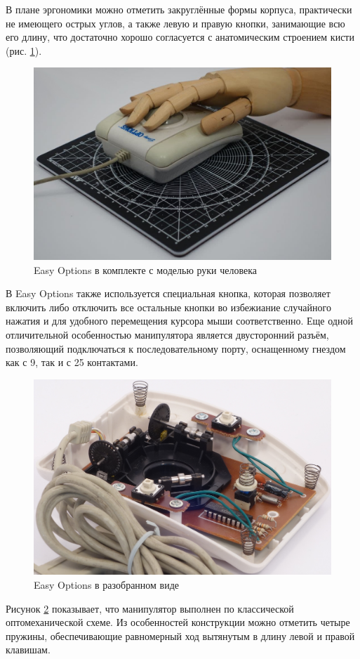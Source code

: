 \documentclass[11pt, a4paper]{article}
\begin{document}
В плане эргономики можно отметить закруглённые формы корпуса, практически не имеющего острых углов, а также левую и правую кнопки, занимающие всю его длину, что достаточно хорошо согласуется с анатомическим строением кисти (рис. \ref{fig:EasyOptionsHand}).

\begin{figure}[h]
    \centering
    \includegraphics[scale=0.3]{1993_easy_options_trackball/opt1.jpg}
    \caption{Easy Options в комплекте с моделью руки человека}
    \label{fig:EasyOptionsHand}
\end{figure}

В Easy Options также используется специальная кнопка, которая позволяет включить либо отключить все остальные кнопки во избежиание случайного нажатия и для удобного перемещения курсора мыши соответственно. Еще одной отличительной особенностью манипулятора является двусторонний разъём, позволяющий подключаться к последовательному порту, оснащенному гнездом как с 9, так и с 25 контактами.

\begin{figure}[h]
    \centering
    \includegraphics[scale=0.6]{1993_easy_options_trackball/sony2.jpg}
    \caption{Easy Options в разобранном виде}
    \label{fig:EasyOptionsInside}
\end{figure}

Рисунок \ref{fig:EasyOptionsInside} показывает, что манипулятор выполнен по классической оптомеханической схеме. Из особенностей конструкции можно отметить четыре пружины, обеспечивающие равномерный ход вытянутым в длину левой и правой клавишам.
\end{document}
